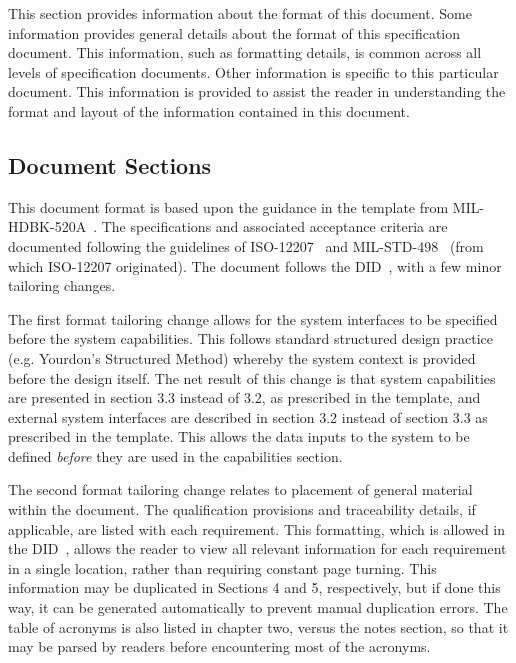 
This section provides information about the format of this document.
Some information provides general details about the format of this specification document.
This information, such as formatting details, is common across all levels of specification documents.
Other information is specific to this particular document.
This information is provided to assist the reader in understanding the format and layout of the information contained in this document.

\subsection{Document Sections}
\label{ssec:Intro_DocSections}

This document format is based upon the guidance in the \SRD template from MIL-HDBK-520A~\cite{ref__MIL_HDBK_520}.
The specifications and associated acceptance criteria are documented following the guidelines of ISO-12207~\cite{ref__ISO_12207} and MIL-STD-498~\cite{ref__MIL_STD_498} (from which ISO-12207 originated).
The document follows the \SSS DID~\cite{ref__SSS_DID}, with a few minor tailoring changes.


The first format tailoring change allows for the system interfaces to be specified before the system capabilities. 
This follows standard structured design practice (e.g. Yourdon's Structured Method) whereby the system context is provided before the design itself.
The net result of this change is that system capabilities are presented in section 3.3 instead of 3.2, as prescribed in the \SSS template, and external system interfaces are described in section 3.2 instead of section 3.3 as prescribed in the \SSS template.
This allows the data inputs to the system to be defined {\em before} they are used in the capabilities section.

The second format tailoring change relates to placement of general material within the document. 
The qualification provisions and traceability details, if applicable, are listed with each requirement.
This formatting, which is allowed in the \SSS DID~\cite{ref__SSS_DID}, allows the reader to view all relevant information for each requirement in a single location, rather than requiring constant page turning.
This information may be duplicated in Sections 4 and 5, respectively, but if done this way, it can be generated automatically to prevent manual duplication errors.
The table of acronyms is also listed in chapter two, versus the notes section, so that it may be parsed by readers before encountering most of the acronyms.

